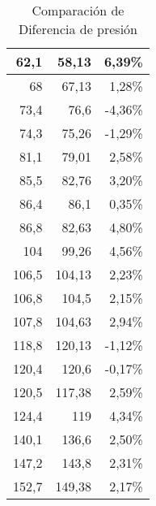 \begin{table}[h!]
\begin{tabular}{|r|r|r}
			62,1 & 58,13 & \multicolumn{1}{r|}{6,39\%} \\ \hline
			68 & 67,13 & \multicolumn{1}{r|}{1,28\%} \\ \hline
			73,4 & 76,6 & \multicolumn{1}{r|}{-4,36\%} \\ \hline
			74,3 & 75,26 & \multicolumn{1}{r|}{-1,29\%} \\ \hline
			81,1 & 79,01 & \multicolumn{1}{r|}{2,58\%} \\ \hline
			85,5 & 82,76 & \multicolumn{1}{r|}{3,20\%} \\ \hline
			86,4 & 86,1 & \multicolumn{1}{r|}{0,35\%} \\ \hline
			86,8 & 82,63 & \multicolumn{1}{r|}{4,80\%} \\ \hline
			104 & 99,26 & \multicolumn{1}{r|}{4,56\%} \\ \hline
			106,5 & 104,13 & \multicolumn{1}{r|}{2,23\%} \\ \hline
			106,8 & 104,5 & \multicolumn{1}{r|}{2,15\%} \\ \hline
			107,8 & 104,63 & \multicolumn{1}{r|}{2,94\%} \\ \hline
			118,8 & 120,13 & \multicolumn{1}{r|}{-1,12\%} \\ \hline
			120,4 & 120,6 & \multicolumn{1}{r|}{-0,17\%} \\ \hline
			120,5 & 117,38 & \multicolumn{1}{r|}{2,59\%} \\ \hline
			124,4 & 119 & \multicolumn{1}{r|}{4,34\%} \\ \hline
			140,1 & 136,6 & \multicolumn{1}{r|}{2,50\%} \\ \hline
			147,2 & 143,8 & \multicolumn{1}{r|}{2,31\%} \\ \hline
			152,7 & 149,38 & \multicolumn{1}{r|}{2,17\%} \\ \hline
		\end{tabular}
	\caption{Comparación de Diferencia de presión}
	\label{difpres}

\end{table}

%
%



